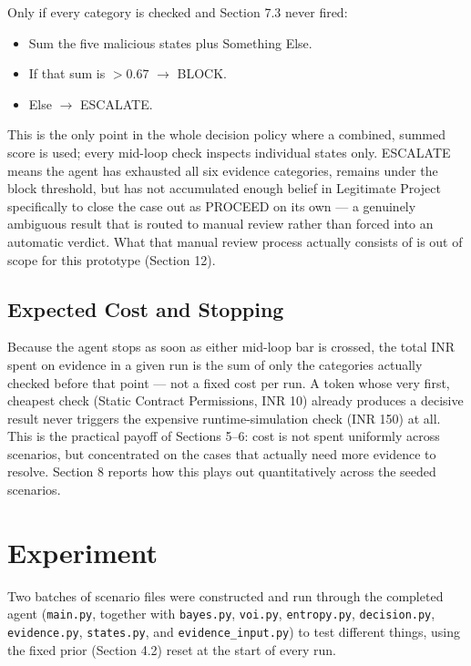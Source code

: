 \documentclass[11pt]{article}
\begin{document}
Only if every category is checked and Section 7.3 never fired:

\begin{itemize}[leftmargin=*]
    \item Sum the five malicious states plus Something Else.
    \item If that sum is $>0.67$ $\rightarrow$ BLOCK.
    \item Else $\rightarrow$ ESCALATE.
\end{itemize}

This is the only point in the whole decision policy where a combined, summed score is used; every mid-loop check inspects individual states only. ESCALATE means the agent has exhausted all six evidence categories, remains under the block threshold, but has not accumulated enough belief in Legitimate Project specifically to close the case out as PROCEED on its own --- a genuinely ambiguous result that is routed to manual review rather than forced into an automatic verdict. What that manual review process actually consists of is out of scope for this prototype (Section 12).

\subsection{Expected Cost and Stopping}

Because the agent stops as soon as either mid-loop bar is crossed, the total INR spent on evidence in a given run is the sum of only the categories actually checked before that point --- not a fixed cost per run. A token whose very first, cheapest check (Static Contract Permissions, INR 10) already produces a decisive result never triggers the expensive runtime-simulation check (INR 150) at all. This is the practical payoff of Sections 5--6: cost is not spent uniformly across scenarios, but concentrated on the cases that actually need more evidence to resolve. Section 8 reports how this plays out quantitatively across the seeded scenarios.

\section{Experiment}

Two batches of scenario files were constructed and run through the completed agent (\texttt{main.py}, together with \texttt{bayes.py}, \texttt{voi.py}, \texttt{entropy.py}, \texttt{decision.py}, \texttt{evidence.py}, \texttt{states.py}, and \texttt{evidence_input.py}) to test different things, using the fixed prior (Section 4.2) reset at the start of every run.
\end{document}
